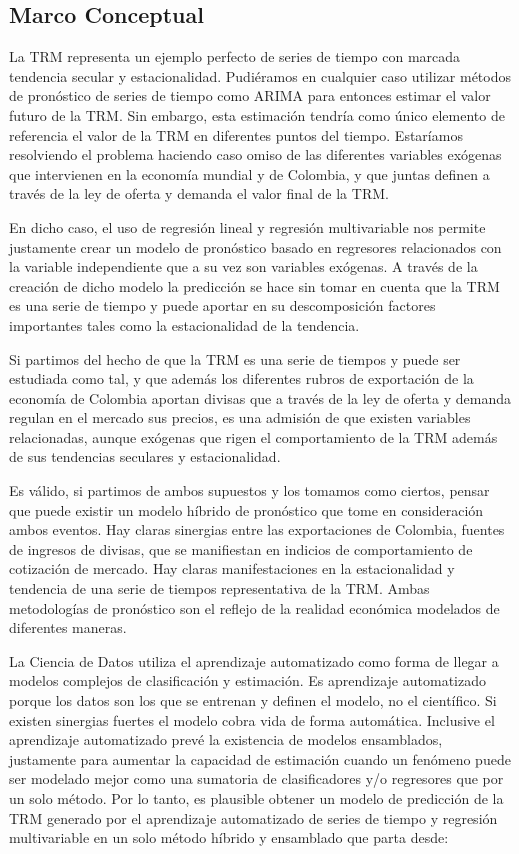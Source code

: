 \subsection{Marco Conceptual}
La TRM representa un ejemplo perfecto de series de tiempo con marcada tendencia secular y estacionalidad. Pudiéramos en cualquier caso utilizar métodos de pronóstico de series de tiempo como ARIMA para entonces estimar el valor futuro de la TRM. Sin embargo, esta estimación tendría como único elemento de referencia el valor de la TRM en diferentes puntos del tiempo. Estaríamos resolviendo el problema haciendo caso omiso de las diferentes variables exógenas que intervienen en la economía mundial y de Colombia, y que juntas definen a través de la ley de oferta y demanda el valor final de la TRM.

En dicho caso, el uso de regresión lineal y regresión multivariable nos permite justamente crear un modelo de pronóstico basado en regresores relacionados con la variable independiente que a su vez son variables exógenas. A través de la creación de dicho modelo la predicción se hace sin tomar en cuenta que la TRM es una serie de tiempo y puede aportar en su descomposición factores importantes tales como la estacionalidad de la tendencia.

Si partimos del hecho de que la TRM es una serie de tiempos y puede ser estudiada como tal, y que además los diferentes rubros de exportación de la economía de Colombia aportan divisas que a través de la ley de oferta y demanda regulan en el mercado sus precios, es una admisión de que existen variables relacionadas, aunque exógenas que rigen el comportamiento de la TRM además de sus tendencias seculares y estacionalidad.

Es válido, si partimos de ambos supuestos y los tomamos como ciertos, pensar que puede existir un modelo híbrido de pronóstico que tome en consideración ambos eventos. Hay claras sinergias entre las exportaciones de Colombia, fuentes de ingresos de divisas, que se manifiestan en indicios de comportamiento de cotización de mercado. Hay claras manifestaciones en la estacionalidad y tendencia de una serie de tiempos representativa de la TRM. Ambas metodologías de pronóstico son el reflejo de la realidad económica modelados de diferentes maneras.

La Ciencia de Datos utiliza el aprendizaje automatizado como forma de llegar a modelos complejos de clasificación y estimación. Es aprendizaje automatizado porque los datos son los que se entrenan y definen el modelo, no el científico. Si existen sinergias fuertes el modelo cobra vida de forma automática. Inclusive el aprendizaje automatizado prevé la existencia de modelos ensamblados, justamente para aumentar la capacidad de estimación cuando un fenómeno puede ser modelado mejor como una sumatoria de clasificadores y/o regresores que por un solo método. Por lo tanto, es plausible obtener un modelo de predicción de la TRM generado por el aprendizaje automatizado de series de tiempo y regresión multivariable en un solo método híbrido y ensamblado que parta desde:

